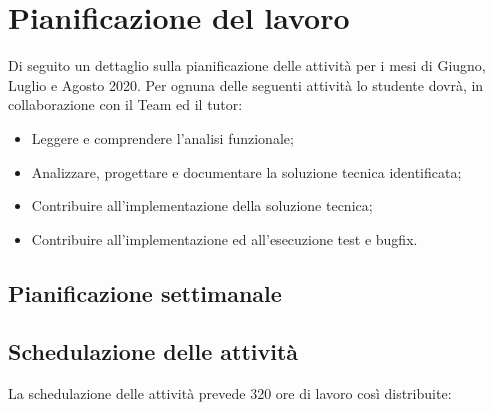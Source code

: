 
\section{Pianificazione del lavoro}
Di seguito un dettaglio sulla pianificazione delle attività per i mesi di Giugno, Luglio e Agosto 2020.
Per ognuna delle seguenti attività lo studente dovrà, in collaborazione con il Team ed il tutor:
\begin{itemize}
	\item Leggere e comprendere l’analisi funzionale;
	\item Analizzare, progettare e documentare la soluzione tecnica identificata;
	\item Contribuire all’implementazione della soluzione tecnica;
	\item Contribuire all’implementazione ed all’esecuzione test e bugfix.
\end{itemize}

\subsection{Pianificazione settimanale}
\prospettoSettimanale


\subsection{Schedulazione delle attività}

La schedulazione delle attività prevede 320 ore di lavoro così distribuite:

\begin{center}
    
\end{center}

